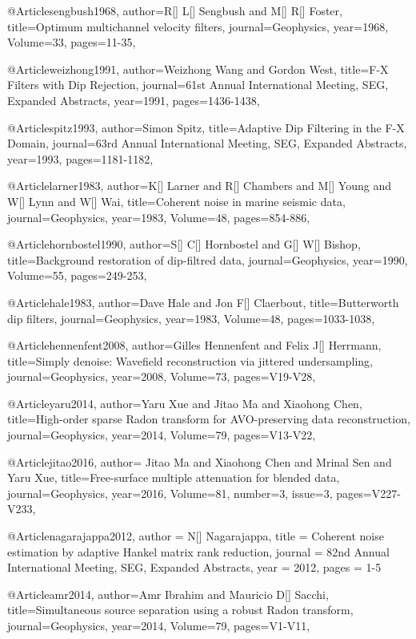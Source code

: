 @Article{sengbush1968,
  author={R[] L[] Sengbush and M[] R[] Foster},
  title={Optimum multichannel velocity filters},
  journal={Geophysics},
  year=1968,
  Volume=33,
  pages={11-35},
}

@Article{weizhong1991,
  author={Weizhong Wang and Gordon West},
  title={F-X Filters with Dip Rejection},
  journal={61st Annual International Meeting, SEG, Expanded Abstracts},
  year=1991,
  pages={1436-1438},
}

@Article{spitz1993,
  author={Simon Spitz},
  title={Adaptive Dip Filtering in the F-X Domain},
  journal={63rd Annual International Meeting, SEG, Expanded Abstracts},
  year=1993,
  pages={1181-1182},
}


@Article{larner1983,
  author={K[] Larner and R[] Chambers and M[] Young and W[] Lynn and W[] Wai},
  title={Coherent noise in marine seismic data},
  journal={Geophysics},
  year=1983,
  Volume=48,
  pages={854-886},
}

@Article{hornbostel1990,
  author={S[] C[] Hornbostel and G[] W[] Bishop},
  title={Background restoration of dip-filtred data},
  journal={Geophysics},
  year=1990,
  Volume=55,
  pages={249-253},
}

@Article{hale1983,
  author={Dave Hale and Jon F[] Claerbout},
  title={Butterworth dip filters},
  journal={Geophysics},
  year=1983,
  Volume=48,
  pages={1033-1038},
}

@Article{hennenfent2008,
  author={Gilles Hennenfent and Felix J[] Herrmann},
  title={Simply denoise: Wavefield reconstruction via jittered undersampling},
  journal={Geophysics},
  year=2008,
  Volume=73,
  pages={V19-V28},
}

@Article{yaru2014,
  author={Yaru Xue and Jitao Ma and Xiaohong Chen},
  title={High-order sparse Radon transform for AVO-preserving data reconstruction},
  journal={Geophysics},
  year=2014,
  Volume=79,
  pages={V13-V22},
}

@Article{jitao2016,
  author={ Jitao Ma and Xiaohong Chen and Mrinal Sen and Yaru Xue},
  title={Free-surface multiple attenuation for blended data},
  journal={Geophysics},
  year=2016,
  Volume=81,
  number=3,
  issue=3,
  pages={V227-V233},
}

@Article{nagarajappa2012,
  author = 	 {N[] Nagarajappa},
  title = 	 {Coherent noise estimation by adaptive Hankel matrix rank reduction},
  journal = 	 {82nd Annual International Meeting, SEG, Expanded Abstracts},
  year = 	 2012,
  pages =	 {1-5}
}

@Article{amr2014,
  author={Amr Ibrahim and Mauricio D[] Sacchi},
  title={Simultaneous source separation using a robust Radon transform},
  journal={Geophysics},
  year=2014,
  Volume=79,
  pages={V1-V11},
}

